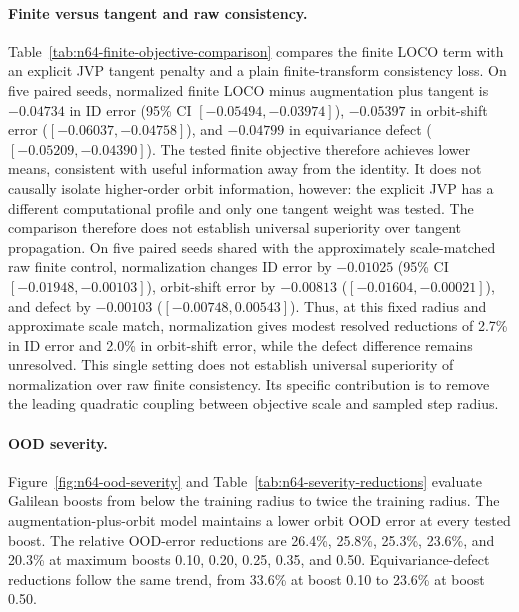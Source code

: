 \paragraph{Finite versus tangent and raw consistency.}
Table~\ref{tab:n64-finite-objective-comparison} compares the finite LOCO term with
an explicit JVP tangent penalty and a plain finite-transform consistency loss.  On
five paired seeds, normalized finite LOCO minus augmentation plus tangent is
\(-0.04734\) in ID error (95\% CI \([-0.05494,-0.03974]\)), \(-0.05397\) in
orbit-shift error (\([-0.06037,-0.04758]\)), and \(-0.04799\) in equivariance
defect (\([-0.05209,-0.04390]\)).  The tested finite objective therefore achieves
lower means, consistent with useful information away from the identity.  It does
not causally isolate higher-order orbit information, however: the explicit JVP has
a different computational profile and only one tangent weight was tested.  The
comparison therefore does not establish universal superiority over tangent
propagation.  On five paired seeds shared with the approximately scale-matched
raw finite control, normalization changes ID error by \(-0.01025\) (95\% CI
\([-0.01948,-0.00103]\)), orbit-shift error by \(-0.00813\)
(\([-0.01604,-0.00021]\)), and defect by \(-0.00103\)
(\([-0.00748,0.00543]\)).  Thus, at this fixed radius and approximate scale
match, normalization gives modest resolved reductions of 2.7\% in ID error and
2.0\% in orbit-shift error, while the defect difference remains unresolved.
This single setting does not establish universal superiority of normalization
over raw finite consistency.  Its specific contribution is to remove the leading
quadratic coupling between objective scale and sampled step radius.

\paragraph{OOD severity.} Figure~\ref{fig:n64-ood-severity} and Table~\ref{tab:n64-severity-reductions} evaluate Galilean boosts from below the training radius to twice the training radius. The augmentation-plus-orbit model maintains a lower orbit OOD error at every tested boost. The relative OOD-error reductions are 26.4\%, 25.8\%, 25.3\%, 23.6\%, and 20.3\% at maximum boosts 0.10, 0.20, 0.25, 0.35, and 0.50. Equivariance-defect reductions follow the same trend, from 33.6\% at boost 0.10 to 23.6\% at boost 0.50.


